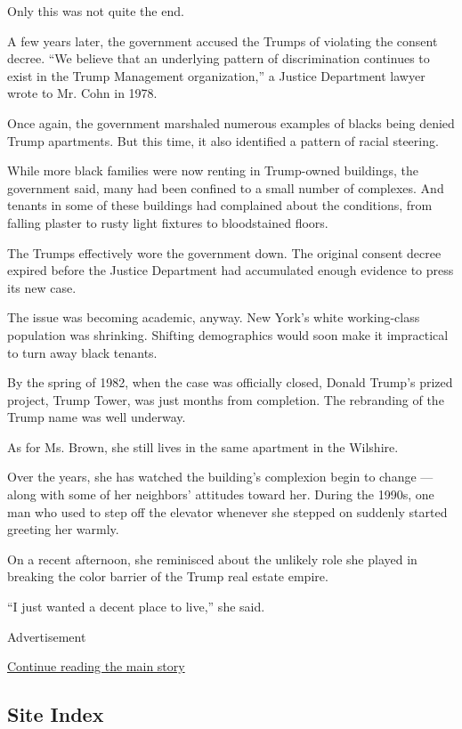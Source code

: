 Only this was not quite the end.

A few years later, the government accused the Trumps of violating the
consent decree. ``We believe that an underlying pattern of
discrimination continues to exist in the Trump Management
organization,'' a Justice Department lawyer wrote to Mr. Cohn in 1978.

Once again, the government marshaled numerous examples of blacks being
denied Trump apartments. But this time, it also identified a pattern of
racial steering.

While more black families were now renting in Trump-owned buildings, the
government said, many had been confined to a small number of complexes.
And tenants in some of these buildings had complained about the
conditions, from falling plaster to rusty light fixtures to bloodstained
floors.

The Trumps effectively wore the government down. The original consent
decree expired before the Justice Department had accumulated enough
evidence to press its new case.

The issue was becoming academic, anyway. New York's white working-class
population was shrinking. Shifting demographics would soon make it
impractical to turn away black tenants.

By the spring of 1982, when the case was officially closed, Donald
Trump's prized project, Trump Tower, was just months from completion.
The rebranding of the Trump name was well underway.

As for Ms. Brown, she still lives in the same apartment in the Wilshire.

Over the years, she has watched the building's complexion begin to
change --- along with some of her neighbors' attitudes toward her.
During the 1990s, one man who used to step off the elevator whenever she
stepped on suddenly started greeting her warmly.

On a recent afternoon, she reminisced about the unlikely role she played
in breaking the color barrier of the Trump real estate empire.

``I just wanted a decent place to live,'' she said.

Advertisement

\protect\hyperlink{after-bottom}{Continue reading the main story}

\hypertarget{site-index}{%
\subsection{Site Index}\label{site-index}}

